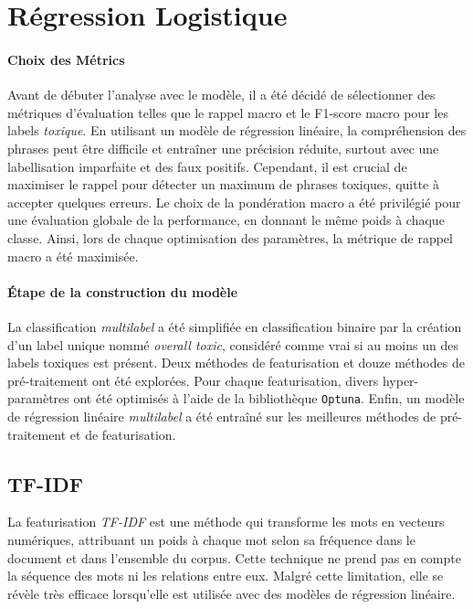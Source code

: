 \chapter{Régression Logistique}

\subsubsection{Choix des Métrics}
Avant de débuter l'analyse avec le modèle, il a été décidé de sélectionner des métriques d'évaluation telles que le rappel macro et le F1-score macro pour les labels \textit{toxique}.
En utilisant un modèle de régression linéaire, la compréhension des phrases peut être difficile et entraîner une précision réduite, surtout avec une labellisation imparfaite et des faux positifs.
Cependant, il est crucial de maximiser le rappel pour détecter un maximum de phrases toxiques, quitte à accepter quelques erreurs. Le choix de la pondération macro a été privilégié pour une évaluation globale de la performance, en donnant le même poids à chaque classe.
Ainsi, lors de chaque optimisation des paramètres, la métrique de rappel macro a été maximisée.


\subsubsection{Étape de la construction du modèle}
La classification \textit{multilabel} a été simplifiée en classification binaire par la création d'un label unique nommé \textit{overall toxic}, considéré comme vrai si au moins un des labels toxiques est présent.
Deux méthodes de featurisation et douze méthodes de pré-traitement ont été explorées.
Pour chaque featurisation, divers hyper-paramètres ont été optimisés à l'aide de la bibliothèque \texttt{Optuna}. 
Enfin, un modèle de régression linéaire \textit{multilabel} a été entraîné sur les meilleures méthodes de pré-traitement et de featurisation.

\section{TF-IDF}
La featurisation \textit{TF-IDF} est une méthode qui transforme les mots en vecteurs numériques, attribuant un poids à chaque mot selon sa fréquence dans le document et dans l'ensemble du corpus.
Cette technique ne prend pas en compte la séquence des mots ni les relations entre eux. Malgré cette limitation, elle se révèle très efficace lorsqu'elle est utilisée avec des modèles de régression linéaire.

